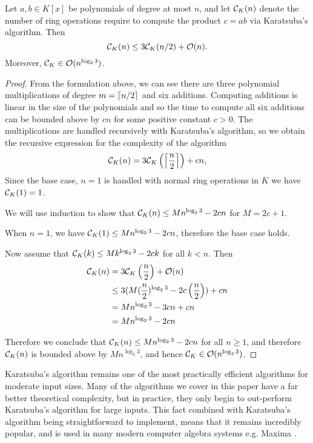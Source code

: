 \begin{theorem}

    Let $a, b \in K[x]$ be polynomials of degree at most $n$, and let $\mathcal C_K(n)$ denote the number of ring operations require to compute the product $c = ab$ via Karatsuba's algorithm. Then
    \[
        \mathcal C_K(n) \le 3\mathcal C_K(n/2) + \mathcal O(n).
    \]
    Moreover, $\mathcal C_K \in \mathcal O(n^{\log_2 3})$.
\end{theorem}

\begin{proof}
    From the formulation above, we can see there are three polynomial multiplications of degree $m = \left \lceil n/2 \right \rceil$ and six additions. Computing additions is linear in the size of the polynomials and so the time to compute all six additions can be bounded above by $cn$ for some positive constant $c > 0$. The multiplications are handled recursively with Karatsuba's algorithm, so we obtain the recursive expression for the complexity of the algorithm
    \[
        \mathcal C_K(n) = 3\mathcal C_K\left(\left \lceil \frac{n}{2} \right \rceil\right) + cn,
    \]
    Since the base case, $n = 1$ is handled with normal ring operations in $K$ we have $\mathcal C_K(1) = 1$.

    We will use induction to show that $\mathcal C_K(n) \le Mn^{\log_2 3} - 2cn$ for $M = 2c + 1$.

    When $n = 1$, we have $\mathcal C_K(1) \le Mn^{\log_2 3} - 2cn$, therefore the base case holds.

    Now assume that $\mathcal C_K(k) \le Mk^{\log_2 3} - 2ck$ for all $k < n$. Then
    \begin{align*}
        \mathcal C_K(n) &= 3\mathcal C_K\left(\frac{n}{2}\right) + \mathcal O(n)\\
                   &\le 3(M(\frac{n}{2})^{\log_2 3} - 2c\left(\frac{n}{2}\right)) + cn\\
                   &= Mn^{\log_2 3} - 3cn + cn\\
                   &= Mn^{\log_2 3} - 2cn
    \end{align*}

    Therefore we conclude that $\mathcal C_K(n) \le Mn^{\log_2 3} - 2cn$ for all $n \ge 1$, and therefore $\mathcal C_K(n)$ is bounded above by $Mn^{\log_2 3}$, and hence $\mathcal C_K \in \mathcal O(n^{\log_2 3})$.
\end{proof}

\medskip

Karatsuba's algorithm remains one of the most practically efficient algorithms for moderate input sizes. Many of the algorithms we cover in this paper have a far better theoretical complexity, but in practice, they only begin to out-perform Karatsuba's algorithm for large inputs. This fact combined with Karatsuba's algorithm being straightforward to implement, means that it remains incredibly popular, and is used in many modern computer algebra systems e.g. Maxima \cite{maxima-karatsuba}.

